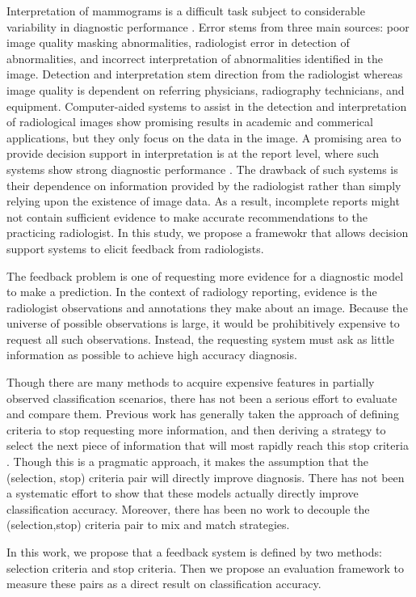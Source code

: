 Interpretation of mammograms is a difficult task subject to considerable variability in diagnostic performance \cite{Elmore:2009vu,Elmore:2012er,Berg:2002fy,Beam:1996ui,Barlow:2004cy}. Error stems from three main sources: poor image quality masking abnormalities, radiologist error in detection of abnormalities, and incorrect interpretation of abnormalities identified in the image. Detection and interpretation stem direction from the radiologist whereas image quality is dependent on referring physicians, radiography technicians, and equipment. Computer-aided systems to assist in the detection and interpretation of radiological images show promising results in academic and commerical applications, but they only focus on the data in the image. A promising area to provide decision support in interpretation is at the report level, where such systems show strong diagnostic performance \cite{Burnside:2000wl,ElizabethS:2005gc,Burnside:2009br}. The drawback of such systems is their dependence on information provided by the radiologist rather than simply relying upon the existence of image data. As a result, incomplete reports might not contain sufficient evidence to make accurate recommendations to the practicing radiologist. In this study, we propose a framewokr that allows decision support systems to elicit feedback from radiologists. 

The feedback problem is one of requesting more evidence for a diagnostic model to make a prediction. In the context of radiology reporting, evidence is the radiologist observations and annotations they make about an image. Because the universe of possible observations is large, it would be prohibitively expensive to request all such observations. Instead, the requesting system must ask as little information as possible to achieve high accuracy diagnosis.

Though there are many methods to acquire expensive features in partially observed classification scenarios, there has not been a serious effort to evaluate and compare them. Previous work has generally taken the approach of defining criteria to stop requesting more information, and then deriving a strategy to select the next piece of information that will most rapidly reach this stop criteria \cite{Heckerman:1992uq,Chi:tp,SaarTsechansky:2009bu}. Though this is a pragmatic approach, it makes the assumption that the (selection, stop) criteria pair will directly improve diagnosis. There has not been a systematic effort to show that these models actually directly improve classification accuracy. Moreover, there has been no work to decouple the (selection,stop) criteria pair to mix and match strategies. 

In this work, we propose that a feedback system is defined by two methods: selection criteria and stop criteria. Then we propose an evaluation framework to measure these pairs as a direct result on classification accuracy.